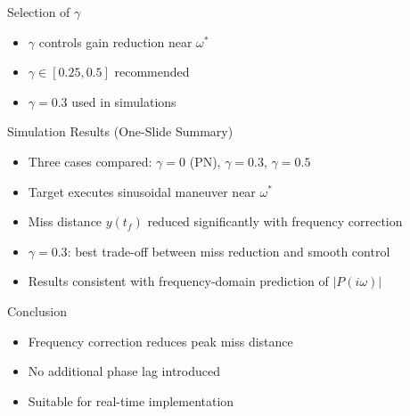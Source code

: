 \documentclass{beamer}
\begin{document}
\begin{frame}{Selection of $\gamma$}
\begin{itemize}
\item $\gamma$ controls gain reduction near $\omega^*$
\item $\gamma\in[0.25,0.5]$ recommended
\item $\gamma=0.3$ used in simulations
\end{itemize}
\end{frame}

\begin{frame}{Simulation Results (One-Slide Summary)}
\begin{itemize}
\item Three cases compared: $\gamma=0$ (PN), $\gamma=0.3$, $\gamma=0.5$
\item Target executes sinusoidal maneuver near $\omega^*$
\item Miss distance $y(t_f)$ reduced significantly with frequency correction
\item $\gamma=0.3$: best trade-off between miss reduction and smooth control
\item Results consistent with frequency-domain prediction of $|P(i\omega)|$
\end{itemize}
\end{frame}

\begin{frame}{Conclusion}
\begin{itemize}
\item Frequency correction reduces peak miss distance
\item No additional phase lag introduced
\item Suitable for real-time implementation
\end{itemize}
\end{frame}
\end{document}
